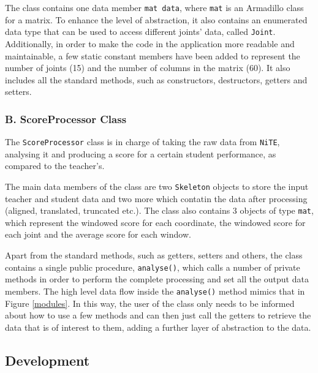 \documentclass[11pt,a4paper]{article}
\begin{document}
\noindent
The class contains one data member \texttt{mat data}, where \texttt{mat} is an Armadillo class for a matrix. To enhance the level of abstraction, it also contains an enumerated data type that can be used to access different joints' data, called \texttt{Joint}. Additionally, in order to make the code in the application more readable and maintainable, a few static constant members have been added to represent the number of joints (15) and the number of columns in the matrix (60). It also includes all the standard methods, such as constructors, destructors, getters and setters.

\subsubsection*{B. ScoreProcessor Class}
\noindent
The \texttt{ScoreProcessor} class is in charge of taking the raw data from \texttt{NiTE}, analysing it and producing a score for a certain student performance, as compared to the teacher's.

\noindent 
The main data members of the class are two \texttt{Skeleton} objects to store the input teacher and student data and two more which contatin the data after processing (aligned, translated, truncated etc.). The class also contains 3 objects of type \texttt{mat}, which represent the windowed score for each coordinate, the windowed score for each joint and the average score for each window.

\noindent
Apart from the standard methods, such as getters, setters and others, the class contains a single public procedure, \texttt{analyse()}, which calls a number of private methods in order to perform the complete processing and set all the output data members. The high level data flow inside the \texttt{analyse()} method mimics that in Figure \ref{modules}. In this way, the user of the class only needs to be informed about how to use a few methods and can then just call the getters to retrieve the data that is of interest to them, adding a further layer of abstraction to the data.
\subsection{Development}
\end{document}
